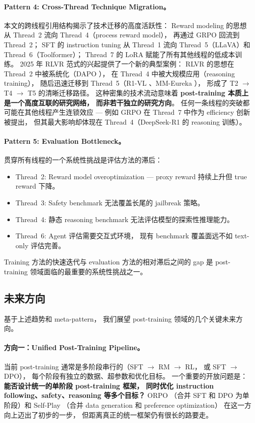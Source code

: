 \paragraph{Pattern 4: Cross-Thread Technique Migration。}
本文的跨线程引用结构揭示了技术迁移的高度活跃性：
Reward modeling 的思想从 Thread~2 流向 Thread~4（process reward model），
再通过 GRPO 回流到 Thread~2；
SFT 的 instruction tuning 从 Thread~1 流向 Thread~5（LLaVA）和 Thread~6（Toolformer）；
Thread~7 的 LoRA 赋能了所有其他线程的低成本训练。
2025 年 RLVR 范式的兴起提供了一个新的典型案例：
RLVR 的思想在 Thread~2 中被系统化（DAPO \cite{yu2025dapo}），
在 Thread~4 中被大规模应用（reasoning training），
随后迅速迁移到 Thread~5（R1-VL \cite{zhang2025r1vl}、MM-Eureka \cite{meng2025mmeureka}），
形成了 T2 $\rightarrow$ T4 $\rightarrow$ T5 的清晰迁移路径。
这种密集的技术流动意味着 \textbf{post-training 本质上是一个高度互联的研究网络，
而非若干独立的研究方向}。
任何一条线程的突破都可能在其他线程产生连锁效应 ---
例如 GRPO 在 Thread~7 中作为 efficiency 创新被提出，
但其最大影响却体现在 Thread~4（DeepSeek-R1 的 reasoning 训练）。

\paragraph{Pattern 5: Evaluation Bottleneck。}
贯穿所有线程的一个系统性挑战是评估方法的滞后：
\begin{itemize}[leftmargin=2em]
  \item Thread~2: Reward model overoptimization ---
    proxy reward 持续上升但 true reward 下降。
  \item Thread~3: Safety benchmark 无法覆盖长尾的 jailbreak 策略。
  \item Thread~4: 静态 reasoning benchmark 无法评估模型的探索性推理能力。
  \item Thread~6: Agent 评估需要交互式环境，
    现有 benchmark 覆盖面远不如 text-only 评估完善。
\end{itemize}
Training 方法的快速迭代与 evaluation 方法的相对滞后之间的 gap
是 post-training 领域面临的最重要的系统性挑战之一。

\subsection{未来方向}
\label{sec:t8-future}

基于上述趋势和 meta-pattern，
我们展望 post-training 领域的几个关键未来方向。

\paragraph{方向一：Unified Post-Training Pipeline。}
当前 post-training 通常是多阶段串行的（SFT $\rightarrow$ RM $\rightarrow$ RL，
或 SFT $\rightarrow$ DPO），
每个阶段有独立的数据、超参数和优化目标。
一个重要的开放问题是：
\textbf{能否设计统一的单阶段 post-training 框架，
同时优化 instruction following、safety、reasoning 等多个目标？}
ORPO \cite{hong2024orpo}（合并 SFT 和 DPO 为单阶段）和
Self-Play \cite{chen2024selfplay}（合并 data generation 和 preference optimization）
在这一方向上迈出了初步的一步，
但距离真正的统一框架仍有很长的路要走。

